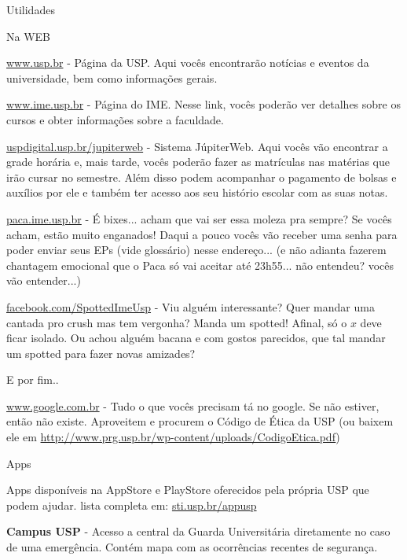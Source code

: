 \begin{secao}{Utilidades}

\begin{subsecao}{Na WEB}

\url{www.usp.br} - Página da USP. Aqui vocês encontrarão notícias e eventos da
universidade, bem como informações gerais.

\url{www.ime.usp.br} - Página do IME.
Nesse link, vocês poderão ver detalhes sobre os cursos e obter informações sobre
a faculdade.

\url{uspdigital.usp.br/jupiterweb} - Sistema JúpiterWeb. Aqui vocês vão
encontrar a grade horária e, mais tarde, vocês poderão fazer as matrículas nas
matérias que irão cursar no semestre. Além disso podem acompanhar o pagamento de
bolsas e auxílios por ele e também ter acesso aos seu histório escolar com as suas notas.

\url{paca.ime.usp.br} - É bixes... acham que vai ser essa moleza pra sempre? Se
vocês acham, estão muito enganados! Daqui a pouco vocês vão receber uma senha para
poder enviar seus EPs (vide glossário) nesse endereço... (e não adianta fazerem
chantagem emocional que o Paca só vai aceitar até 23h55... não entendeu? vocês
vão entender...)

\url{facebook.com/SpottedImeUsp} - Viu alguém interessante? Quer mandar uma cantada
pro crush mas tem vergonha? Manda um spotted! Afinal, só o $x$ deve ficar isolado.
Ou achou alguém bacana e com gostos parecidos, que tal mandar um spotted para 
fazer novas amizades? 


E por fim..

\url{www.google.com.br} - Tudo o que vocês precisam tá no google. Se não estiver,
então não existe. Aproveitem e procurem o Código de Ética da USP (ou baixem ele em
\url{http://www.prg.usp.br/wp-content/uploads/CodigoEtica.pdf})

\end{subsecao}

\begin{subsecao}{Apps}
	
Apps disponíveis na AppStore e PlayStore oferecidos pela própria USP que podem ajudar. lista completa em: \url{sti.usp.br/appusp}

{\bf Campus USP} - Acesso a central da Guarda Universitária diretamente no caso de uma emergência. Contém mapa com as ocorrências recentes de segurança. 


\end{subsecao}
\end{secao}
